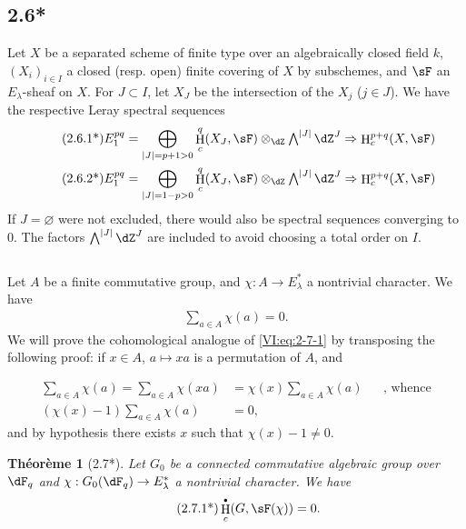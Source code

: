 \documentclass[oneside]{book}
\DeclareMathOperator{\h}{H}
\newcounter{char}
\theoremstyle{sga-source}
\theoremstyle{sga-source-dash}
\theoremstyle{sga-source-dotdash}
\theoremstyle{sga-source-number-note-dash}
\theoremstyle{sga-source-note-number-dotdash}
\theoremstyle{sga-source-example-dotdash}
\theoremstyle{sga-source-inline-number}
\theoremstyle{sga-source-bare-number}
\theoremstyle{sga-source}
\newtheorem*{theorem*}{Théorème}
\let\oldbullet\bullet
\renewcommand{\bullet}{\textnormal{\tiny$\oldbullet$}}
\newcommand{\PrintPage}[1]{}\newcommand{\MathPage}[1]{}\newcommand{\PrintCite}[2]{#1}\newcommand{\var}[3]{#2}
\begin{document}
\subsection*{2.6*}\label{VI:2-6*}

Let $X$ be a separated scheme of finite type over an algebraically closed field $k$, 
$(X_i)_{i\in I}$ a closed (resp. open) finite covering of $X$ by 
subschemes, and $\sF$ an $E_\lambda$-sheaf on $X$. For $J\subset I$, 
let $X_J$ be the intersection of the $X_j$ ($j\in J$). We have the respective 
Leray spectral sequences 
\begin{align*}\tag{2.6.1*}\label{VI:eq:2-6-1*}
  E_1^{p q} &= \bigoplus_{|J|=p+1>0} \h_c^q(X_J,\sF) \otimes_\dZ \textstyle\bigwedge^{|J|} \dZ^J \Rightarrow \h_c^{p+q}(X,\sF) \\ 
  \tag{2.6.2*}\label{VI:eq:2-6-2*}
  E_1^{p q} &= \bigoplus_{|J|=1-p>0} \h_c^q(X_J,\sF) \otimes_\dZ \textstyle\bigwedge^{|J|} \dZ^J \Rightarrow \h_c^{p+q}(X,\sF)
\end{align*}
If $J=\varnothing$ were not excluded, there would also be spectral 
sequences converging to $0$. The factors $\bigwedge^{|J|} \dZ^J$ are included 
to avoid choosing a total order on $I$. 





\subsection{}\label{VI:2-7}

Let $A$ be a finite commutative group, and $\chi:A \to E_\lambda^\ast$ a 
nontrivial character. We have 
\begin{align*}\tag{2.7.1}\label{VI:eq:2-7-1}
  \sum_{a\in A} \chi(a) = 0 \text{.}
\end{align*}
We will prove the cohomological analogue of \eqref{VI:eq:2-7-1} by transposing 
the following proof: if $x\in A$, $a\mapsto x a$ is a permutation of $A$, and 
\PrintPage{187}
\begin{align*}
  \sum_{a\in A}\chi(a) = \sum_{a\in A} \chi(x a) &= \chi(x) \sum_{a\in A} \chi(a) && \text{, whence} \\
  (\chi(x)-1)\sum_{a\in A}\chi(a) &= 0 \text{,}
\end{align*}
and by hypothesis there exists $x$ such that $\chi(x)-1\ne 0$. 





\begin{theorem*}[2.7*]\label{VI:2-7*}
Let $G_0$ be a connected commutative algebraic group over $\dF_q$ and 
$\chi:G_0(\dF_q) \to E_\lambda^\ast$ a nontrivial character. We have 
\begin{align*}\tag{2.7.1*}\label{VI:eq:2-7-1*}
  \h_c^\bullet(G,\sF(\chi)) = 0 \text{.}
\end{align*}
\end{theorem*}
\end{document}
